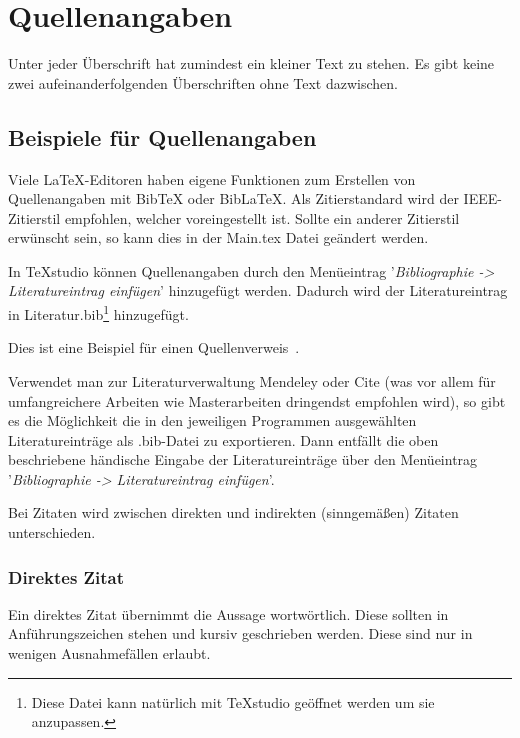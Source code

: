 %
%
%
%

\section{Quellenangaben}

Unter jeder Überschrift hat zumindest ein kleiner Text zu stehen. Es gibt keine zwei aufeinanderfolgenden Überschriften ohne Text dazwischen.


\subsection{Beispiele für Quellenangaben}

Viele LaTeX-Editoren haben eigene Funktionen zum Erstellen von Quellenangaben mit BibTeX oder BibLaTeX. Als Zitierstandard wird der IEEE-Zitierstil empfohlen, welcher voreingestellt ist. Sollte ein anderer Zitierstil erwünscht sein, so kann dies in der Main.tex Datei geändert werden.

In TeXstudio können Quellenangaben durch den Menüeintrag '\textit{Bibliographie -> Literatureintrag einfügen}' hinzugefügt werden. Dadurch wird der Literatureintrag in Literatur.bib\footnote{Diese Datei kann natürlich mit TeXstudio geöffnet werden um sie anzupassen.} hinzugefügt. 

Dies ist eine Beispiel für einen Quellenverweis~\cite{Hunt2019}.

Verwendet man zur Literaturverwaltung Mendeley oder Cite (was vor allem für umfangreichere Arbeiten wie Masterarbeiten dringendst empfohlen wird), so gibt es die Möglichkeit die in den jeweiligen Programmen ausgewählten Literatureinträge als .bib-Datei zu exportieren. Dann entfällt die oben beschriebene händische Eingabe der Literatureinträge über den Menüeintrag '\textit{Bibliographie -> Literatureintrag einfügen}'.

Bei Zitaten wird zwischen direkten und indirekten (sinngemäßen) Zitaten unterschieden.


\subsubsection{Direktes Zitat}

Ein direktes Zitat übernimmt die Aussage wortwörtlich. Diese sollten in Anführungszeichen stehen und kursiv geschrieben werden. Diese sind nur in wenigen Ausnahmefällen erlaubt.

